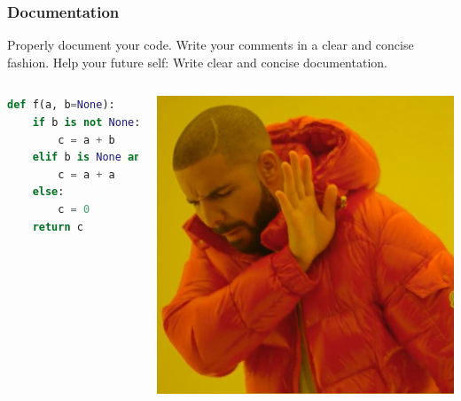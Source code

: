 \begin{frame}[fragile]
  \frametitle{Documentation}
    Properly document your code. Write your comments in a clear and concise fashion. Help your future self: Write clear and concise documentation.
    \begin{columns}
    \begin{lstlisting}[language=Python]
def f(a, b=None):
    if b is not None:
        c = a + b
    elif b is None and a is not None:
        c = a + a
    else:
        c = 0
    return c
    \end{lstlisting}
    \includegraphics[width=\columnwidth]{figures/drakeno.jpg}
    \end{columns}
\end{frame}

